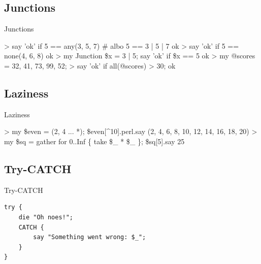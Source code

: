 \documentclass{beamer}
\begin{document}
			\subsection{Junctions}
\begin{frame}[fragile]{Junctions}
	\begin{semiverbatim}
\alert{> say 'ok' if 5 == any(3, 5, 7) # albo 5 == 3 | 5 | 7}
ok
\alert{> say 'ok' if 5 == none(4, 6, 8)}
ok
\alert{> my Junction \$x = 3 | 5; say 'ok' if \$x == 5}
ok
\alert{> my @scores = 32, 41, 73, 99, 52;
> say 'ok' if all(@scores) > 30;}
ok
	\end{semiverbatim}
\end{frame}
			\subsection{Laziness}
\begin{frame}[fragile]{Laziness}
	\begin{semiverbatim}
\alert{> my \$even = (2, 4 ... *); \$even[\^\relax{}10].perl.say}
(2, 4, 6, 8, 10, 12, 14, 16, 18, 20)
\alert{> my \$sq = gather for 0..Inf \{ take \$\_ * \$\_ \}; \$sq[5].say}
25
	\end{semiverbatim}
\end{frame}
			\subsection{Try-CATCH}
\begin{frame}[fragile]{Try-CATCH}
\begin{verbatim}
try {
    die "Oh noes!";
    CATCH {
        say "Something went wrong: $_";
    }
}
\end{verbatim}
\end{frame}
\end{document}
